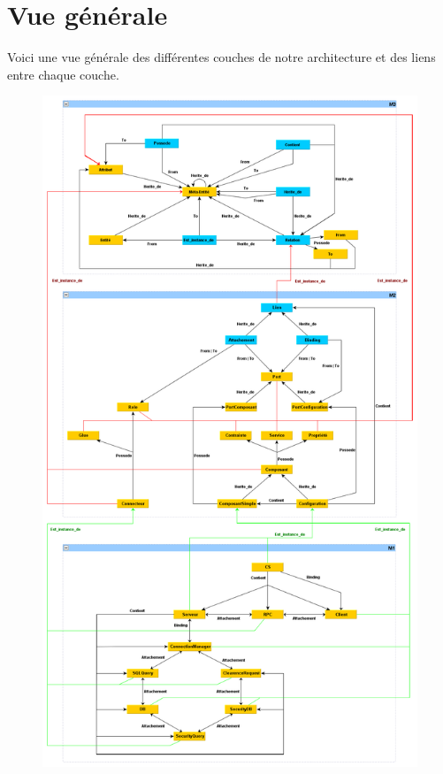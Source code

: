 ﻿\chapter{Vue générale}

	Voici une vue générale des différentes couches de notre architecture et des
	liens entre chaque couche.

	\begin{figure}[!h]
		\centering
		\includegraphics[scale=0.30]{../images/m.PNG}
	\end{figure}

\clearpage
